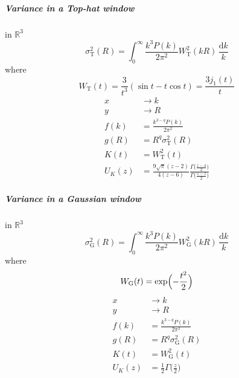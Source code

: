 \documentclass{article}
\renewcommand{\d}{\mathrm{d}}
\newcommand{\Mellin}{U}
\newcommand{\Tophat}{\mathrm{T}}
\newcommand{\Gauss}{\mathrm{G}}
\begin{document}
\subparagraph{Variance in a Top-hat window}
in $\mathbb{R}^3$
\begin{equation}
    \sigma_\Tophat^2(R) = \int_0^\infty \frac{k^3P(k)}{2\pi^2} W_\Tophat^2(kR) \,\frac{\d k}k
\end{equation}
where
\begin{equation}
    W_\Tophat(t) = \frac3{t^3}(\sin t - t\cos t) = \frac{3j_1(t)}t
\end{equation}
\begin{align}
    x &\to k \\
    y &\to R \\
    f(k) &= \frac{k^{3-q}P(k)}{2\pi^2} \\
    g(R) &= R^q \sigma_\Tophat^2(R) \\
    K(t) &= W_\Tophat^2(t) \\
    \Mellin_K(z) &= \frac{9\sqrt{\pi}(z-2)}{4(z-6)}
        \frac{\Gamma\bigl(\frac{z-4}2\bigr)}{\Gamma\bigl(\frac{5-z}2\bigr)}
\end{align}


\subparagraph{Variance in a Gaussian window}
in $\mathbb{R}^3$
\begin{equation}
    \sigma_\Gauss^2(R) = \int_0^\infty \frac{k^3P(k)}{2\pi^2} W_\Gauss^2(kR) \,\frac{\d k}k
\end{equation}
where
\begin{equation}
    W_\Gauss(t) = \exp\Bigl(-\frac{t^2}2\Bigr)
\end{equation}
\begin{align}
    x &\to k \\
    y &\to R \\
    f(k) &= \frac{k^{3-q}P(k)}{2\pi^2} \\
    g(R) &= R^q \sigma_\Gauss^2(R) \\
    K(t) &= W_\Gauss^2(t) \\
    \Mellin_K(z) &= \frac12 \Gamma\bigl(\frac{z}2\bigr)
\end{align}


\end{document}
